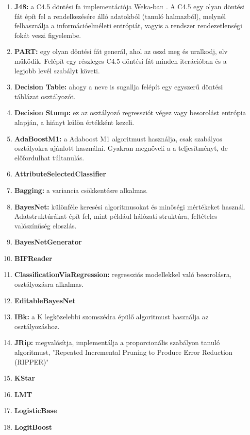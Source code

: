 \documentclass[12pt, a4paper, oneside]{book}
\theoremstyle{tetel}
\begin{document}
\begin{enumerate}
  \item \textbf{J48: }a C4.5 döntési fa implementációja Weka-ban  \cite{16}. A C4.5 egy olyan döntési fát épít fel a rendelkezésére álló adatokból (tanuló halmazból), melynél felhasználja a információelméleti entrópiát, vagyis a rendszer rendezetlenségi fokát veszi figyelembe. 
  \item \textbf{PART: }egy olyan döntési fát generál, ahol az oszd meg és uralkodj, elv működik. Felépít egy részleges C4.5 döntési fát minden iterációban és a legjobb levél szabályt követi.
  \item \textbf{Decision Table: }ahogy a neve is sugallja felépít egy egyszerű döntési táblázat osztályozót. 
  \item \textbf{Decision Stump: }ez az osztályozó regressziót végez vagy besorolást entrópia alapján, a hiányt külön értékként kezeli.  
  \item \textbf{AdaBoostM1: } a Adaboost M1 \cite{22,23} algoritmust használja, csak szabályos osztályokra ajánlott használni. Gyakran megnöveli a a teljesítményt, de előfordulhat túltanulás. 
  \item \textbf{AttributeSelectedClassifier \cite{28}}
  \item \textbf{Bagging: }a variancia csökkentésre alkalmas.
  \item \textbf{BayesNet: }különféle keresési algoritmusokat és minőségi mértékeket használ. Adatstruktúrákat épít fel, mint például hálózati struktúra, feltételes valószínűség eloszlás. 
  \item \textbf{BayesNetGenerator \cite{28}}
  \item \textbf{BIFReader \cite{28}}
  \item \textbf{ClassificationViaRegression: }regressziós modellekkel való besorolásra, osztályozásra alkalmas.
  \item \textbf{EditableBayesNet \cite{28}}
  \item \textbf{IBk: }a K legközelebbi szomszédra \cite{24} épülő algoritmust használja az osztályozáshoz.
  \item \textbf{JRip: }megvalósítja, implementálja a proporcionális szabályon tanuló algoritmust, "Repeated Incremental Pruning to Produce Error Reduction (RIPPER)"\cite{25}
  \item \textbf{KStar \cite{28}}
  \item \textbf{LMT \cite{28}}
  \item \textbf{LogisticBase \cite{28}}
  \item \textbf{LogitBoost \cite{28}}

\end{enumerate}
\end{document}
